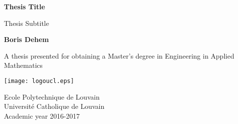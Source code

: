 \begin{titlepage}
    \begin{center}
        \vspace*{1cm}

        \Huge
        \textbf{Thesis Title}

        \vspace{0.5cm}
        \LARGE
        Thesis Subtitle

        \vspace{1.5cm}

        \textbf{Boris Dehem}

        \vfill

        A thesis presented for obtaining a Master's degree in Engineering in Applied Mathematics

        \vspace{0.8cm}

        \texttt{[image: logoucl.eps]}

        \Large
        Ecole Polytechnique de Louvain\\
        Université Catholique de Louvain\\
        Academic year 2016-2017

    \end{center}
\end{titlepage}
